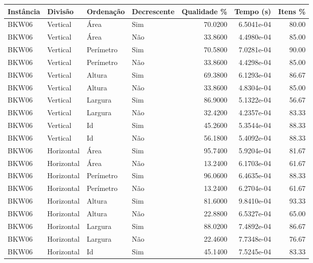 \begin{tabular}{llllrrr}
\hline
Instância & Divisão     & Ordenação & Decrescente & Qualidade \% & Tempo (s)  & Itens \% \\
\hline
BKW06     & Vertical    & Área      & Sim         & 70.0200      & 6.5041e-04 & 80.00    \\
BKW06     & Vertical    & Área      & Não         & 33.8600      & 4.4980e-04 & 85.00    \\
BKW06     & Vertical    & Perímetro & Sim         & 70.5800      & 7.0281e-04 & 90.00    \\
BKW06     & Vertical    & Perímetro & Não         & 33.8600      & 4.4298e-04 & 85.00    \\
BKW06     & Vertical    & Altura    & Sim         & 69.3800      & 6.1293e-04 & 86.67    \\
BKW06     & Vertical    & Altura    & Não         & 33.8600      & 4.8304e-04 & 85.00    \\
BKW06     & Vertical    & Largura   & Sim         & 86.9000      & 5.1322e-04 & 56.67    \\
BKW06     & Vertical    & Largura   & Não         & 32.4200      & 4.2357e-04 & 83.33    \\
BKW06     & Vertical    & Id        & Sim         & 45.2600      & 5.3544e-04 & 88.33    \\
BKW06     & Vertical    & Id        & Não         & 56.1800      & 5.4092e-04 & 88.33    \\
BKW06     & Horizontal  & Área      & Sim         & 95.7400      & 5.9204e-04 & 81.67    \\
BKW06     & Horizontal  & Área      & Não         & 13.2400      & 6.1703e-04 & 61.67    \\
BKW06     & Horizontal  & Perímetro & Sim         & 96.0600      & 6.4635e-04 & 88.33    \\
BKW06     & Horizontal  & Perímetro & Não         & 13.2400      & 6.2704e-04 & 61.67    \\
BKW06     & Horizontal  & Altura    & Sim         & 81.6000      & 9.8410e-04 & 93.33    \\
BKW06     & Horizontal  & Altura    & Não         & 22.8800      & 6.5327e-04 & 65.00    \\
BKW06     & Horizontal  & Largura   & Sim         & 88.0200      & 7.4892e-04 & 86.67    \\
BKW06     & Horizontal  & Largura   & Não         & 22.4600      & 7.7348e-04 & 76.67    \\
BKW06     & Horizontal  & Id        & Sim         & 45.1400      & 7.5245e-04 & 83.33    \\

\end{tabular}
